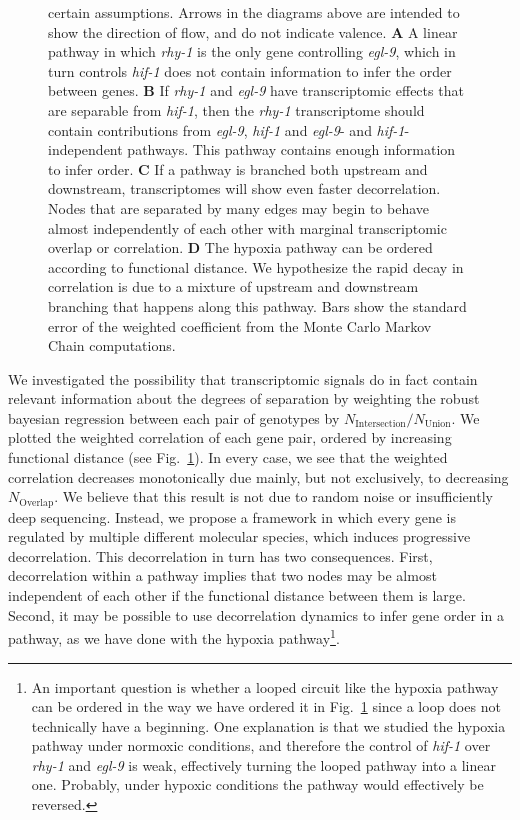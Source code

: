 \documentclass[9pt,twocolumn,twoside]{pnas-new}
\newcommand{\gene}[1]{\emph{#1}}
\begin{document}
\begin{figure}[tbhp]
{certain assumptions. Arrows in the diagrams above are intended to show the
direction of flow, and do not indicate valence.
\textbf{A} A linear pathway in which \gene{rhy-1} is the only gene controlling
\gene{egl-9}, which in turn controls \gene{hif-1} does not contain information
to infer the order between genes.
\textbf{B} If \gene{rhy-1} and \gene{egl-9} have transcriptomic effects that are
separable from \gene{hif-1}, then the \gene{rhy-1} transcriptome should contain
contributions from \gene{egl-9}, \gene{hif-1} and \gene{egl-9}- and
\gene{hif-1}-independent pathways. This pathway contains enough information to
infer order.
\textbf{C} If a pathway is branched both upstream and downstream,
transcriptomes will show even faster decorrelation. Nodes that are
separated by many edges may begin to behave almost independently of each other
with marginal transcriptomic overlap or correlation.
\textbf{D} The hypoxia pathway can be ordered according to functional distance.
We hypothesize the rapid decay in correlation is due to a mixture of
upstream and downstream branching that happens along this pathway. Bars show the
standard error of the weighted coefficient from the Monte Carlo Markov Chain
computations.
}
\label{fig:decorrelation}
\end{figure}

We investigated the possibility that transcriptomic signals do in fact contain
relevant information about the degrees of separation by weighting the robust
bayesian regression between each pair of genotypes by
$N_\mathrm{Intersection}/N_{\mathrm{Union}}$. We plotted the weighted
correlation of each gene pair, ordered by increasing functional distance
(see Fig.~\ref{fig:decorrelation}). In every case, we see that the weighted
correlation decreases monotonically due mainly, but not exclusively, to
decreasing $N_\mathrm{Overlap}$.
We believe that this result is not due to random noise or insufficiently deep
sequencing. Instead, we propose a framework in which every gene is regulated
by multiple different molecular species, which induces progressive decorrelation.
This decorrelation in turn has two consequences. First, decorrelation within a
pathway implies that two nodes may be almost independent of each other if the
functional distance between them is large. Second, it may be possible to use
decorrelation dynamics to infer gene order in a pathway, as we have done with
the hypoxia
pathway\footnote{
An important question is whether a looped circuit
like the hypoxia pathway can be ordered in the way we have ordered it in
Fig.~\ref{fig:decorrelation} since a loop does not technically have a beginning.
One explanation is that we studied the hypoxia pathway under normoxic conditions,
and therefore the control of \gene{hif-1} over \gene{rhy-1} and \gene{egl-9} is
weak, effectively turning the looped pathway into a linear one. Probably, under
hypoxic conditions the pathway would effectively be reversed.
}.
\end{document}
